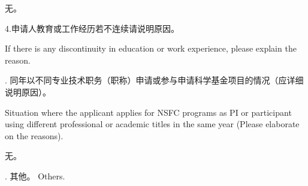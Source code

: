 \documentclass[12pt,UTF8,AutoFakeBold=4,a4paper]{ctexart}
\begin{document}
\bigskip

无。

\bigskip

{\sihao \color{MsBlue} \kaishu 4.申请人教育或工作经历若不连续请说明原因。}

\bigskip

{\color{MsBlue} \xiaosihao {} 
If there is any discontinuity in education or work experience, please explain the reason.}

{\sihao \color{MsBlue} . 同年以不同专业技术职务（职称）申请或参与申请科学基金项目的情况（应详细说明原因）。 

\bigskip

\xiaosihao {} Situation where the applicant applies for NSFC programs as PI or participant using different professional or academic titles in the same year (Please elaborate on the reasons).}

\bigskip

无。

\bigskip

{\sihao \color{MsBlue} . 其他。 
\xiaosihao {} Others.}
\end{document}
